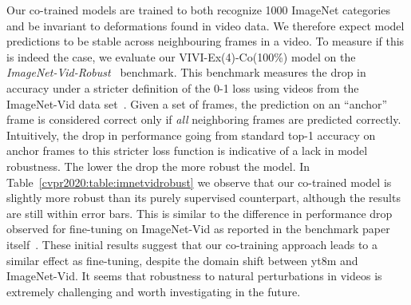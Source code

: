 \documentclass[10pt,twocolumn,letterpaper]{article}
\renewcommand{\paragraph}[1]{\noindent{\bf #1}\quad}
\begin{document}
\paragraph{Robustness to video perturbations} Our co-trained models are trained to both recognize 1000 ImageNet categories and be invariant to deformations found in video data. We therefore expect model predictions to be stable across neighbouring frames in a video.
To measure if this is indeed the case, we evaluate our VIVI-Ex(4)-Co(100\%) model on the \emph{ImageNet-Vid-Robust}~\cite{shankar2019systematic} benchmark.
This benchmark measures the drop in accuracy under a stricter definition of the 0-1 loss using videos from the ImageNet-Vid data set~\cite{imagenet}. Given a set of frames, the prediction on an ``anchor'' frame is considered correct only if \emph{all} neighboring frames are predicted correctly. Intuitively, the drop in performance going from standard top-1 accuracy on anchor frames to this stricter loss function is indicative of a lack in model robustness. The lower the drop the more robust the model. In Table~\ref{cvpr2020:table:imnetvidrobust} we observe that our co-trained model is slightly more robust than its purely supervised counterpart, although the results are still within error bars. This is similar to the difference in performance drop observed for fine-tuning on ImageNet-Vid as reported in the benchmark paper itself~\cite[Table 1]{shankar2019systematic}. These initial results suggest that our co-training approach leads to a similar effect as fine-tuning, despite the domain shift between \gls{yt8m} and ImageNet-Vid.
It seems that robustness to natural perturbations in videos is extremely challenging and worth investigating in the future.
\end{document}
